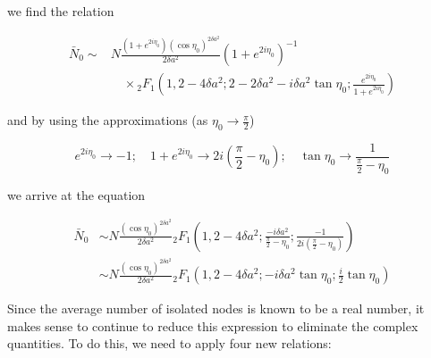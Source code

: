 \documentclass[preprint,notitlepage,amsmath,amssymb,floatfix]{revtex4-1}
\begin{document}
\noindent we find the relation

\begin{equation}
\begin{split}
\bar{N}_0 \sim &N\frac{\left(1+e^{2i\eta_0}\right)\left(\cos\eta_0\right)^{2\delta a^2}}{2\delta a^2}\left(1+e^{2i\eta_0}\right)^{-1} \\
&\quad \times {}_2F_1\left(1,2-4\delta a^2;2-2\delta a^2-i\delta a^2\tan\eta_0;\frac{e^{2i\eta_0}}{1+e^{2i\eta_0}}\right)
\end{split}
\end{equation}

\noindent and by using the approximations (as $\eta_0\to\frac{\pi}{2}$)

\begin{equation}
e^{2i\eta_0}\to -1;\quad 1+e^{2i\eta_0}\to 2i\left(\frac{\pi}{2} - \eta_0\right);\quad \tan\eta_0\to\frac{1}{\frac{\pi}{2}-\eta_0}
\end{equation}

we arrive at the equation

\begin{equation}
\begin{split}
\bar{N}_0 &\sim N\frac{\left(\cos\eta_0\right)^{2\delta a^2}}{2\delta a^2} {}_2F_1\left(1,2-4\delta a^2;\frac{-i\delta a^2}{\frac{\pi}{2}-\eta_0};\frac{-1}{2i\left(\frac{\pi}{2}-\eta_0\right)}\right) \\
&\sim N\frac{\left(\cos\eta_0\right)^{2\delta a^2}}{2\delta a^2} {}_2F_1\left(1,2-4\delta a^2;-i\delta a^2\tan\eta_0;\frac{i}{2}\tan\eta_0\right)
\end{split}
\end{equation}

Since the average number of isolated nodes is known to be a real number, it makes sense to continue to reduce this expression to eliminate the complex quantities.  
To do this, we need to apply four new relations:
\end{document}
